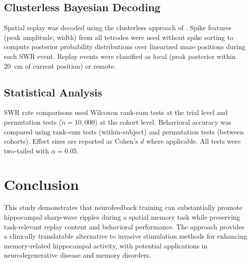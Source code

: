 \documentclass[11pt]{article}
\begin{document}
\subsection{Clusterless Bayesian Decoding}

Spatial replay was decoded using the clusterless approach of \citet{denovellis2021}. Spike features (peak amplitude, width) from all tetrodes were used without spike sorting to compute posterior probability distributions over linearized maze positions during each SWR event. Replay events were classified as local (peak posterior within 20~cm of current position) or remote.

\subsection{Statistical Analysis}

SWR rate comparisons used Wilcoxon rank-sum tests at the trial level and permutation tests ($n = 10{,}000$) at the cohort level. Behavioral accuracy was compared using rank-sum tests (within-subject) and permutation tests (between cohorts). Effect sizes are reported as Cohen's $d$ where applicable. All tests were two-tailed with $\alpha = 0.05$.

\section{Conclusion}

This study demonstrates that neurofeedback training can substantially promote hippocampal sharp-wave ripples during a spatial memory task while preserving task-relevant replay content and behavioral performance. The approach provides a clinically translatable alternative to invasive stimulation methods for enhancing memory-related hippocampal activity, with potential applications in neurodegenerative disease and memory disorders.



\end{document}
